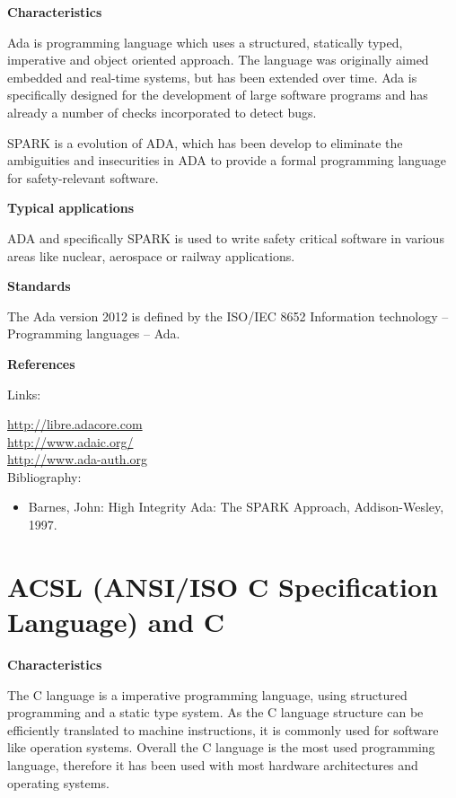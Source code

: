 \documentclass{./template/openetcs_report}
\begin{document}
	\textbf{Characteristics}

Ada is programming language which uses a structured, statically typed, imperative and object oriented approach. The language was originally aimed embedded and real-time systems, but has been extended over time. Ada is specifically designed for the development of large software programs and has already a number of checks incorporated to detect bugs. 

SPARK is a evolution of ADA, which has been develop to eliminate the ambiguities and insecurities in ADA to provide a formal programming language for safety-relevant software. 

	\textbf{Typical applications}

ADA and specifically SPARK is used to write safety critical software in various areas like nuclear, aerospace or railway applications.

	\textbf{Standards}

The Ada version 2012 is defined by the ISO/IEC 8652 Information technology -- Programming languages -- Ada.

	\textbf{References}

Links:

\url{http://libre.adacore.com} \\[4pt]
\url{http://www.adaic.org/} \\[4pt]
\url{http://www.ada-auth.org} \\[4pt]


Bibliography:

\begin{itemize}
\item Barnes, John: High Integrity Ada: The SPARK Approach, Addison-Wesley, 1997.
\end{itemize} 

\section{ACSL (ANSI/ISO C Specification Language) and C}


	\textbf{Characteristics}

The C language is a imperative programming language, using structured programming and a static type system. As the C language structure can be efficiently translated to machine instructions, it is commonly used for software like operation systems. Overall the C language is the most used programming language, therefore it has been used with most hardware architectures and operating systems.
\end{document}
